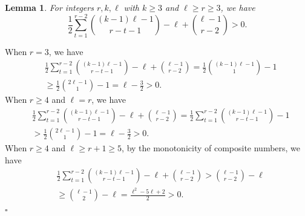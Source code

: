 \documentclass[12pt]{article}%
\newtheorem{lemma}[theorem]{Lemma}
\newenvironment{proof}{{\noindent\it Proof.}}{\hfill $\square$\par}
\begin{document}
 \fi
   \begin{lemma}\label{lem: the ineuqlaity in sec 3 (2)}
 For integers $r,k,\ell$ with $k\geq 3$ and $\ell\geq r\geq 3$, we have
     $$\frac{1}{2}\sum_{t=1}^{r-2}\binom{(k-1)\ell-1}{r-t-1}-\ell+\binom{\ell-1}{r-2}>0.$$
 \end{lemma}
 \begin{proof}
     When $r=3$, we have
     \begin{equation*}
         \begin{aligned}
             &\frac{1}{2}\sum_{t=1}^{r-2}\binom{(k-1)\ell-1}{r-t-1}-\ell+\binom{\ell-1}{r-2}=\frac{1}{2}\binom{(k-1)\ell-1}{1}-1\\
             &\geq \frac{1}{2}\binom{2\ell-1}{1}-1
             =\ell-\frac{3}{2}>0.
         \end{aligned}
     \end{equation*}
     When $r\geq 4$ and $\ell=r$, we have
     \begin{equation*}
         \begin{aligned}
             &\frac{1}{2}\sum_{t=1}^{r-2}\binom{(k-1)\ell-1}{r-t-1}-\ell+\binom{\ell-1}{r-2}=\frac{1}{2}\sum_{t=1}^{r-2}\binom{(k-1)\ell-1}{r-t-1}-1\\
             &>\frac{1}{2}\binom{2\ell-1}{1}-1
             =\ell-\frac{3}{2}>0.
         \end{aligned}
     \end{equation*}
     When $r\geq 4$ and $\ell\geq r+1\ge 5$, by the monotonicity of composite numbers, we have
     \begin{equation*}
         \begin{aligned}
             &\frac{1}{2}\sum_{t=1}^{r-2}\binom{(k-1)\ell-1}{r-t-1}-\ell+\binom{\ell-1}{r-2}>\binom{\ell-1}{r-2}-\ell\\
             &\geq \binom{\ell-1}{2}-\ell
             =\frac{\ell^2-5\ell+2}{2}>0.
        \end{aligned}
    \end{equation*}
 \end{proof}
 \iffalse
\end{document}
